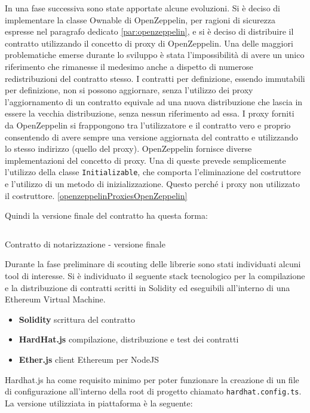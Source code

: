 \documentclass[a4paper,11pt]{article}
\begin{document}
In una fase successiva sono state apportate alcune evoluzioni. Si è deciso di implementare la classe Ownable di OpenZeppelin, per ragioni di sicurezza espresse nel paragrafo dedicato \ref{par:openzeppelin}, e si è deciso di distribuire il contratto utilizzando il concetto di proxy di OpenZeppelin. Una delle maggiori problematiche emerse durante lo sviluppo è stata l'impossibilità di avere un unico riferimento che rimanesse il medesimo anche a dispetto di numerose redistribuzioni del contratto stesso. I contratti per definizione, essendo immutabili per definizione, non si possono aggiornare, senza l'utilizzo dei proxy l'aggiornamento di un contratto equivale ad una nuova distribuzione che lascia in essere la vecchia distribuzione, senza nessun riferimento ad essa. I proxy forniti da OpenZeppelin si frappongono tra l'utilizzatore e il contratto vero e proprio consentendo di avere sempre una versione aggiornata del contratto e utilizzando lo stesso indirizzo (quello del proxy). OpenZeppelin fornisce diverse implementazioni del concetto di proxy. Una di queste prevede semplicemente l'utilizzo della classe \texttt{Initializable}, che comporta l'eliminazione del costruttore e l'utilizzo di un metodo di inizializzazione. Questo perché i proxy non utilizzato il costruttore. \ref{openzeppelinProxiesOpenZeppelin}

Quindi la versione finale del contratto ha questa forma:

\begin{listing}[H]
  \inputminted{solidity}{./code/Hash.v2.sol}
  \caption{Contratto di notarizzazione - versione finale}
  \label{listing:hash2}
\end{listing}

Durante la fase preliminare di scouting delle librerie sono stati individuati alcuni tool di interesse. Si è individuato il seguente stack tecnologico per la compilazione e la distribuzione di contratti scritti in Solidity ed eseguibili all'interno di una Ethereum Virtual Machine.

\begin{itemize}
  \item \textbf{Solidity} scrittura del contratto
  \item \textbf{HardHat.js} compilazione, distribuzione e test dei contratti
  \item \textbf{Ether.js} client Ethereum per NodeJS
\end{itemize}

Hardhat.js ha come requisito minimo per poter funzionare la creazione di un file di configurazione all'interno della root di progetto chiamato \texttt{hardhat.config.ts}. La versione utilizziata in piattaforma è la seguente:
\end{document}

